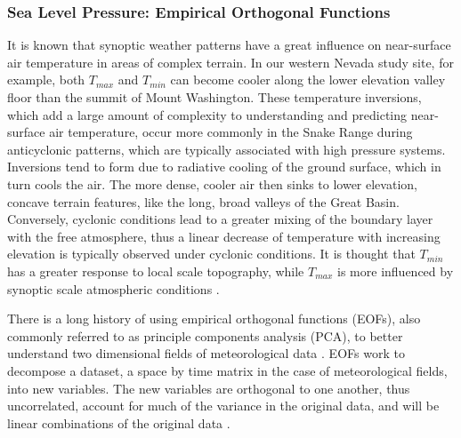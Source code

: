 \documentclass{ametsoc}
\begin{document}
\subsubsection{Sea Level Pressure: Empirical Orthogonal Functions}
It is known that synoptic weather patterns have a great influence on near-surface
 air temperature in areas of complex terrain.  In our western Nevada
study site, for example, both $T_{max}$ and $T_{min}$ can become
cooler along the lower elevation valley floor than the summit of Mount
Washington.  These temperature inversions, which add a large amount of
complexity to understanding and predicting near-surface air temperature, occur
more commonly in the Snake Range during anticyclonic
patterns, which are typically associated with high pressure systems.  Inversions
tend to form due to radiative cooling of the ground surface, which in turn cools
the air.  The more dense, cooler air then sinks to lower elevation, concave
terrain features, like the long, broad valleys of the Great Basin.  Conversely,
cyclonic conditions lead to a greater mixing of the boundary layer with the free
atmosphere, thus a linear decrease of temperature with increasing elevation is typically
observed under cyclonic conditions.  It is thought that $T_{min}$ has a greater
response to local scale topography, while $T_{max}$ is more influenced by synoptic
scale atmospheric conditions \citep{Lundquist2008a,Lundquist2007,Pepin2011}.

There is a long history of using empirical orthogonal functions (EOFs), also
commonly referred to as principle components analysis (PCA), to better
understand two dimensional fields of meteorological data \citep{Hannachi2007}.
EOFs work to decompose a dataset, a space by time matrix in the case of
meteorological fields, into new variables.  The new variables are orthogonal to
one another, thus uncorrelated, account for much of the variance in the original
data, and will be linear combinations of the original data \citep{Hannachi2007}.
\end{document}
